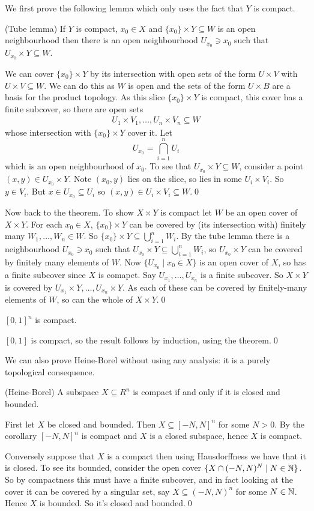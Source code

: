 \documentclass{article}
\begin{document}
\pf We first prove the following lemma which only uses the fact that $ Y $ is compact.
\begin{lemma}
	(Tube lemma) If $ Y $ is compact, $ x_0\in X $ and $ \{x_0\}\times Y\subseteq W $ is an open neighbourhood then there is an open neighbourhood $ U_{x_0}\ni x_0 $ such that $ U_{x_0}\times Y\subseteq W $.
\end{lemma}
\pf We can cover $ \{x_0\} \times Y $ by its intersection with open sets of the form $ U\times V $ with $ U\times V\subseteq W $. We can do this as $ W $ is open and the sets of the form $ U\times B $ are a basis for the product topology. As this slice $ \{x_0\} \times Y $ is compact, this cover has a finite subcover, so there are open sets
\begin{align*}
  U_1\times V_1,\dots, U_n\times V_n\subseteq W
\end{align*}
whose intersection with $ \{x_0\} \times Y $ cover it. Let
\[
	U_{x_0} = \bigcap_{i=1}^n U_i
\]
which is an open neighbourhood of $ x_0 $. To see that $ U_{x_0}\times Y\subseteq W $, consider a point $ (x,y)\in U_{x_0}\times Y $. Note $ (x_0,y) $ lies on the slice, so lies in some $ U_i\times V_i $. So $ y\in V_i $. But $ x\in U_{x_0}\subseteq U_i $ so $ (x,y)\in U_i\times V_i\subseteq W $.\qed
\par
Now back to the theorem. To show $ X\times Y $ is compact let $ W $ be an open cover of $ X\times Y $. For each $ x_0\in X $, $ \{x_0\}\times Y $ can be covered by (its intersection with) finitely many $ W_1,\dots, W_n\in W $. So $ \{x_0\} \times Y \subseteq \bigcup_{i=1}^n W_i $. By the tube lemma there is a neighbourhood $ U_{x_0} \ni x_0 $ such that $ U_{x_0} \times Y \subseteq \bigcup_{i=1}^n W_i $, so $ U_{x_0}\times Y $ can be covered by finitely many elements of $ W $. Now $ \{U_{x_0}\mid x_0\in X\} $ is an open cover of $ X $, so has a finite subcover since $ X $ is comapct. Say $ U_{x_1},\dots, U_{x_n} $ is a finite subcover. So $ X\times Y $ is covered by $ U_{x_1}\times Y,\dots, U_{x_n}\times Y $. As each of these can be covered by finitely-many elements of $ W $, so can the whole of $ X\times Y $.\qed
\begin{corollary}
	$ [0,1]^n $ is compact.
\end{corollary}
\pf $ [0,1] $ is compact, so the result follows by induction, using the theorem.\qed
\par
We can also prove Heine-Borel without using any analysis: it is a purely topological consequence.
\begin{corollary}
	(Heine-Borel) A subspace $ X\subseteq R^n $ is compact if and only if it is closed and bounded.
\end{corollary}
First let $ X $ be closed and bounded. Then $ X\subseteq [-N,N]^n$ for some $ N>0 $. By the corollary $ [-N,N]^n $ is compact and $ X $ is a closed subspace, hence $ X $ is compact.\par
Conversely suppose that $ X $ is a compact then using Hausdorffness we have that it is closed. To see its bounded, consider the open cover $ \{X\cap (-N,N)^N \mid N\in \mathbb{N}\} $. So by compactness this must have a finite subcover, and in fact looking at the cover it can be covered by a singular set, say $ X\subseteq (-N,N)^n $ for some $ N\in \mathbb{N} $. Hence $ X $ is bounded. So it's closed and bounded.\qed
\end{document}
